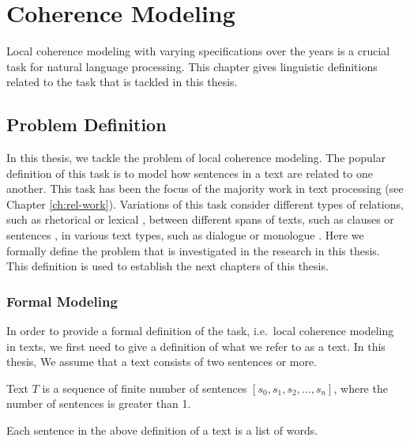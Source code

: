 
\chapter{Coherence Modeling}
\label{ch:coherence}

Local coherence modeling with varying specifications over the years is a crucial task for natural language processing. 
This chapter gives linguistic definitions related to the task that is tackled in this thesis. 


\section{Problem Definition}
\label{sec:coh-def}

In this thesis, we tackle the problem of local coherence modeling. 
The popular definition of this task is to model how sentences in a text are related to one another. 
This task has been the focus of the majority work in text processing (see Chapter \ref{ch:rel-work}). 
Variations of this task consider different types of relations, such as rhetorical \cite{hovyeduard89} or lexical \cite{morris91}, between different spans of texts, such as clauses \cite{strube.col98} or sentences \cite{halliday76}, in various text types, such as dialogue \cite{wangxinhao13} or monologue \cite{barzilay08}. 
Here we formally define the problem that is investigated in the research in this thesis.  
This definition is used to establish the next chapters of this thesis. 

\subsection{Formal Modeling}

In order to provide a formal definition of the task, i.e.\ local coherence modeling in texts, we first need to give a definition of what we refer to as a text. 
In this thesis, 
We assume that a text consists of two sentences or more.  

\begin{definition}
Text $T$ is a sequence of finite number of sentences $[s_0, s_1, s_2, ..., s_n]$, where the number of sentences is greater than 1.   
\end{definition}

Each sentence in the above definition of a text is a list of words.

